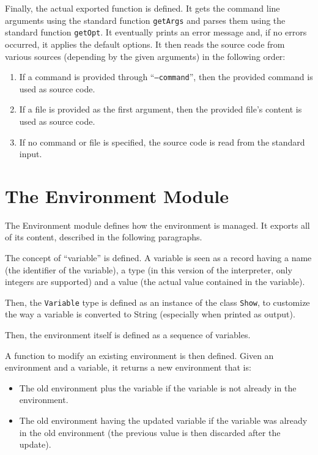 \documentclass{esposito-documentation}
\begin{document}


Finally, the actual exported function is defined. It gets the command line
arguments using the standard function \lstinline|getArgs| and parses them using
the standard function \lstinline|getOpt|. It eventually prints an error message
and, if no errors occurred, it applies the default options. It then reads the
source code from various sources (depending by the given arguments) in the
following order:
\begin{enumerate}
	\item If a command is provided through ``\texttt{--command}'', then the
		provided command is used as source code.
	\item If a file is provided as the first argument, then the provided file's
		content is used as source code.
	\item If no command or file is specified, the source code is read from the
		standard input.
\end{enumerate}


\section{The Environment Module}


The Environment module defines how the environment is managed. It exports all
of its content, described in the following paragraphs.

The concept of ``variable'' is defined. A variable is seen as a record having a
name (the identifier of the variable), a type (in this version of the
interpreter, only integers are supported) and a value (the actual value
contained in the variable).



Then, the \lstinline|Variable| type is defined as an instance of the class
\lstinline|Show|, to customize the way a variable is converted to String
(especially when printed as output).



Then, the environment itself is defined as a sequence of variables.



A function to modify an existing environment is then defined. Given an
environment and a variable, it returns a new environment that is:
\begin{itemize}
	\item The old environment plus the variable if the variable is not already
		in the environment.
	\item The old environment having the updated variable if the variable was
		already in the old environment (the previous value is then discarded
		after the update).
\end{itemize}

\end{document}
